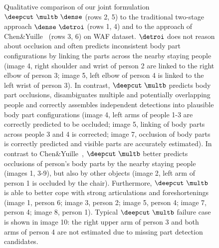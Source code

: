 \begin{figure}
  \caption{Qualitative comparison of our joint formulation
    $\deepcut~\multb~\dense$ (rows 2, 5) to the traditional two-stage
    approach $\dense~\detroi$ (rows 1, 4) and to the approach of
    Chen\&Yuille~\cite{Chen:2015:POC} (rows 3, 6) on WAF
    dataset. $\detroi$ does not reason about occlusion and often
    predicts inconsistent body part configurations by linking the
    parts across the nearby staying people (image 4, right shoulder
    and wrist of person 2 are linked to the right elbow of person 3;
    image 5, left elbow of person 4 is linked to the left wrist of
    person 3). In contrast, $\deepcut~\multb$ predicts body part
    occlusions, disambiguates multiple and potentially overlapping
    people and correctly assembles independent detections into
    plausible body part configurations (image 4, left arms of people
    1-3 are correctly predicted to be occluded; image 5, linking of
    body parts across people 3 and 4 is corrected; image 7, occlusion
    of body parts is correctly predicted and visible parts are
    accurately estimated). In contrast to
    Chen\&Yuille~\cite{Chen:2015:POC}, $\deepcut~\multb$ better
    predicts occlusions of person's body parts by the nearby staying
    people (images 1, 3-9), but also by other objects (image 2, left
    arm of person 1 is occluded by the chair). Furthermore,
    $\deepcut~\multb$ is able to better cope with strong articulations
    and foreshortenings (image 1, person 6; image 3, person 2; image
    5, person 4; image 7, person 4; image 8, person 1). Typical
    $\deepcut~\multb$ failure case is shown in image 10: the right
    upper arm of person 3 and both arms of person 4 are not estimated
    due to missing part detection candidates.}
  \label{fig:qualitative_waf}
\end{figure}

